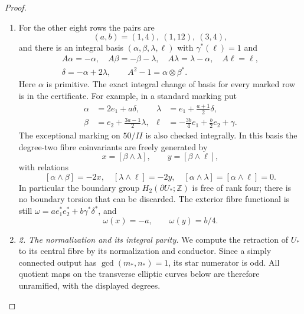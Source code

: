 \begin{proof}
\begin{enumerate}[label=\arabic*.,leftmargin=*]
\item For the other eight rows the pairs are
\[
 (a,b)=(1,4),\ (1,12),\ (3,4),                             \tag{D.ST2}\label{maps:eq:D.ST2}
\]
and there is an integral basis $(\alpha,\beta,\lambda,\ell)$
with $\gamma^*(\ell)=1$ and
\[
\begin{gathered}
 A\alpha=-\alpha,\quad A\beta=-\beta-\lambda,\quad
 A\lambda=\lambda-\alpha,\quad A\ell=\ell,\\
 \delta=-\alpha+2\lambda,\qquad
 A^2-1=\alpha\otimes\beta^*.
\end{gathered}                                               \tag{D.ST3}\label{maps:eq:D.ST3}
\]
Here $\alpha$ is primitive. The exact integral change of basis
for every marked row is in the certificate. For example, in a
standard marking put
\[
\begin{aligned}
 \alpha&=2e_1+a\delta,&
 \lambda&=e_1+\tfrac{a+1}{2}\delta,\\
 \beta&=e_2+\tfrac{3a-1}{2}\lambda,&
 \ell&=-\tfrac{3b}{4}e_1+\tfrac b2e_2+\gamma.
\end{aligned}
\]
The exceptional marking on $50/II$ is also checked integrally.
In this basis the degree-two fibre coinvariants are freely
generated by
\[
 x=[\beta\wedge\lambda],\qquad y=[\beta\wedge\ell],
\]
with relations
\[
 [\alpha\wedge\beta]=-2x,\quad
 [\lambda\wedge\ell]=-2y,\quad
 [\alpha\wedge\lambda]=[\alpha\wedge\ell]=0.                \tag{D.ST4}\label{maps:eq:D.ST4}
\]
In particular the boundary group $H_2(\partial U_*;\mathbb Z)$
is free of rank four; there is no boundary torsion that can be
discarded. The exterior fibre functional is still
$\omega=a e_1^*e_2^*+b\gamma^*\delta^*$, and
\[
 \omega(x)=-a,\qquad \omega(y)=b/4.                         \tag{D.ST5}\label{maps:eq:D.ST5}
\]

\item \emph{2. The normalization and its integral parity.}
We compute the retraction of $U_*$ to its central fibre by its
normalization and conductor. Since a simply connected output
has $\gcd(m_*,n_*)=1$, its star numerator is odd. All quotient
maps on the transverse elliptic curves below are therefore
unramified, with the displayed degrees.


\end{enumerate}
\end{proof}
